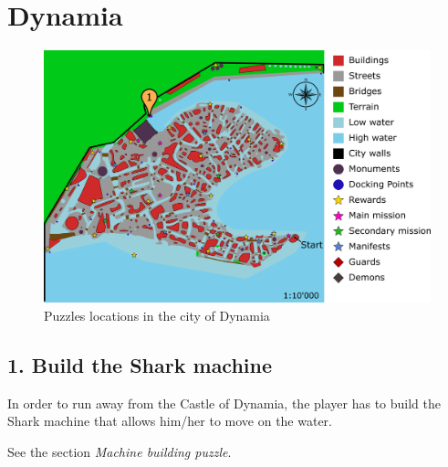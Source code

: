 {\let\clearpage\relax\section{Dynamia}}

\begin{figure}[H]
  \centering
  \includegraphics[width=\textwidth]{Images/Maps/dynamiaPuzzles}
  \caption{Puzzles locations in the city of Dynamia}
\end{figure}

\subsection{1. Build the Shark machine}

In order to run away from the Castle of Dynamia, the player has to build the Shark machine that allows him/her to move on the water.

See the section \textit{Machine building puzzle}.
